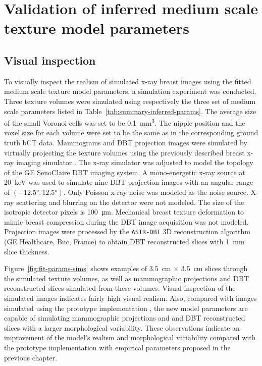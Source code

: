 \documentclass[journal]{IEEEtran}
\begin{document}
\section{Validation of inferred medium scale texture model parameters}
\label{sec:valid-inferr-medi}

\subsection{Visual inspection}
\label{sec:visual-validation-1}

To visually inspect the realism of simulated x-ray breast images using
the fitted medium scale texture model parameters, a simulation
experiment was conducted. Three texture volumes were simulated using
respectively the three set of medium scale parameters listed in
Table~\ref{tab:summary-inferred-params}. The average size of the small
Voronoi cells was set to be \SI{0.1}{\mm\cubed}. The nipple position
and the voxel size for each volume were set to be the same as in the
corresponding ground truth bCT data. Mammograms and DBT projection
images were simulated by virtually projecting the texture volumes
using the previously described breast x-ray imaging simulator
\cite{milioni2014low}. The x-ray simulator was adjusted to model the
topology of the GE SenoClaire DBT imaging system. A mono-energetic
x-ray source at \SI{20}{\keV} was used to simulate nine DBT projection
images with an angular range of $( \ang{-12.5}, \ang{12.5} )$. Only
Poisson x-ray noise was modeled as the noise source. X-ray scattering
and blurring on the detector were not modeled. The size of the
isotropic detector pixels is \SI{100}{\um}. Mechanical breast texture
deformation to mimic breast compression during the DBT image
acquisition was not modeled. Projection images were processed by the
\texttt{ASIR-DBT} 3D reconstruction algorithm (GE Healthcare, Buc,
France) to obtain DBT reconstructed slices with \SI{1}{\mm} slice
thickness.

Figure~\ref{fig:fit-params-sims} shows examples of \SI{3.5}{\cm}
$\times$ \SI{3.5}{\cm} slices through the simulated texture volumes,
as well as mammographic projections and DBT reconstructed slices
simulated from these volumes. Visual inspection of the simulated
images indicates fairly high visual realism. Also, compared with
images simulated using the prototype implementation
\cite{li2016novel}, the new model parameters are capable of simulating
mammographic projections and and DBT reconstructed slices with a
larger morphological variability. These observations indicate an
improvement of the model's realism and morphological variability
compared with the prototype implementation with empirical parameters
proposed in the previous chapter.
\end{document}
